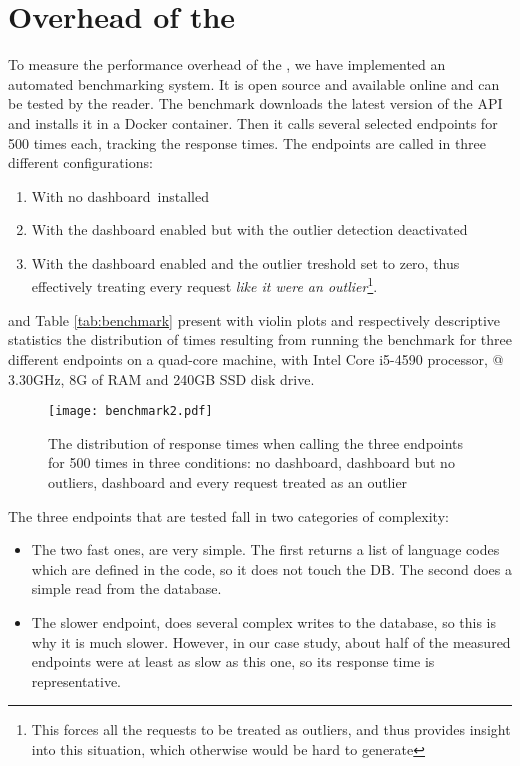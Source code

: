   
\newpage
\section{Overhead of the \tool}
\label{sec:overhead}

To measure the performance overhead of the \tool, we have implemented an automated benchmarking system. It is open source and available online and can be tested by the reader. The benchmark downloads the latest version of the \zee API and installs it in a Docker container. Then it calls several selected endpoints for 500 times each, tracking the response times. The endpoints are called in three different configurations: 

	\begin{enumerate}
		\item With no dashboard installed
		\item With the dashboard enabled but with the outlier detection deactivated
		\item With the dashboard enabled and the outlier treshold set to zero, thus effectively treating every request {\em like it were an outlier}\footnote{This forces all the requests to be treated as outliers, and thus provides insight into this situation, which otherwise would be hard to generate}.
	\end{enumerate}



 and Table \ref{tab:benchmark} present with violin plots and respectively descriptive statistics the distribution of times resulting from running the benchmark for three different endpoints on a quad-core machine, with Intel Core i5-4590 processor, @ 3.30GHz, 8G of RAM and 240GB SSD disk drive.


\begin{figure}[h!]
	\centering
	\texttt{[image: benchmark2.pdf]}
	\caption{The distribution of response times when calling the three endpoints for 500 times in three conditions: no dashboard, dashboard but no outliers, dashboard and every request treated as an outlier}
	\label{fig:bench}
\end{figure}




	The three endpoints that are tested fall in two categories of complexity: 
	\begin{itemize}
		\item The two fast ones, are very simple. 
		The first returns a list of language codes which are defined in the code, so it does not touch the DB. The second does a simple read from the database. 
		\item The slower endpoint, does several complex writes to the database, so this is why it is much slower. However, in our case study, about half of the measured endpoints were at least as slow as this one, so its response time is representative.
	\end{itemize}

